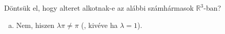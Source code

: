 \documentclass[exercise]{math-standalone}
\begin{document}
\begin{exercise}{%
    Döntsük el, hogy alteret alkotnak-e az alábbi számhármasok
    $\mathbb R^3$-ban?
  }
{\begin{enumerate}[a)]
\begin{enumerate}[1)]
              \item Skalárral való szorzásra való ellenőrzés:
                    $\forall \rvec a \in Q_1 \text{ és } \forall \lambda \in \mathbb R:
                      \lambda \rvec a \overset{?}{\in} Q_1$.
                    \[
                      \rvec a := \begin{pmatrix} a \\ -a \\ c \end{pmatrix}
                      \quad \rightarrow \quad
                      \lambda \rvec a
                      = \begin{pmatrix} \lambda a \\ \lambda (-a) \\ \lambda c \end{pmatrix}
                      = \begin{pmatrix} \lambda a \\ -(\lambda a) \\ \lambda c \end{pmatrix}
                      \in Q_1
                    \]
            \end{enumerate}

            \tcbline
      \item Nem, hiszen $\lambda \pi \neq \pi$ (, kivéve ha $\lambda = 1$).


\end{enumerate}}
\end{exercise}
\end{document}
